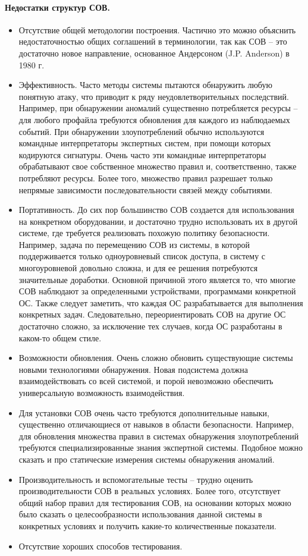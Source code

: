 \paragraph*{Недостатки структур СОВ.}

\begin{itemize}
	\item Отсутствие общей методологии построения. Частично это можно объяснить недостаточностью общих соглашений в терминологии, так как СОВ – это достаточно новое направление, основанное Андерсоном (J.P. Anderson) в 1980 г.
	\item Эффективность. Часто методы системы пытаются обнаружить любую понятную атаку, что приводит к ряду неудовлетворительных последствий. Например, при обнаружении аномалий существенно потребляется ресурсы – для любого профайла требуются обновления для каждого из наблюдаемых событий. При обнаружении злоупотреблений обычно используются командные интерпретаторы экспертных систем, при помощи которых кодируются сигнатуры. Очень часто эти командные интерпретаторы обрабатывают свое собственное множество правил и, соответственно, также потребляют ресурсы. Более того, множество правил разрешает только непрямые зависимости последовательности связей между событиями.
	\item Портативность. До сих пор большинство СОВ создается для использования на конкретном оборудовании, и достаточно трудно использовать их в другой системе, где требуется реализовать похожую политику безопасности. Например, задача по перемещению СОВ из системы, в которой поддерживается только одноуровневый список доступа, в систему с многоуровневой довольно сложна, и для ее решения потребуются значительные доработки. Основной причиной этого является то, что многие СОВ наблюдают за определенными устройствами, программами конкретной ОС. Также следует заметить, что каждая ОС разрабатывается для выполнения конкретных задач. Следовательно, переориентировать СОВ на другие ОС достаточно сложно, за исключение тех случаев, когда ОС разработаны в каком-то общем стиле.
	\item Возможности обновления. Очень сложно обновить существующие системы новыми технологиями обнаружения. Новая подсистема должна взаимодействовать со всей системой, и порой невозможно обеспечить универсальную возможность взаимодействия.
	\item Для установки СОВ очень часто требуются дополнительные навыки, существенно отличающиеся от навыков в области безопасности. Например, для обновления множества правил в системах обнаружения злоупотреблений требуются специализированные знания экспертной системы. Подобное можно сказать и про статические измерения системы обнаружения аномалий.
	\item Производительность и вспомогательные тесты – трудно оценить производительности СОВ в реальных условиях. Более того, отсутствует общий набор правил для тестирования СОВ, на основании которых можно было сказать о целесообразности использования данной системы в конкретных условиях и получить какие-то количественные показатели.
	\item Отсутствие хороших способов тестирования.
	
\end{itemize}

